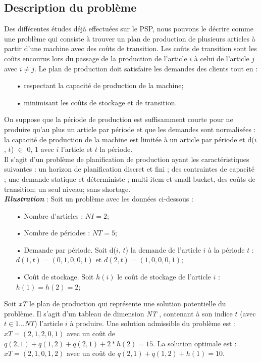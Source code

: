 	\subsection{Description du problème}{\label{sec:problem_description}}

		Des différentes études \cite{ratheil_master} \cite{ceschia} déjà effectuées sur le PSP, nous pouvons le décrire comme une problème qui consiste à trouver un plan de production de plusieurs articles à partir d’une machine avec des coûts de transition. Les coûts de transition sont les coûts encourus lors du passage de la production de l’article $i$ à celui de l’article $j$ avec $i \neq j$. Le plan de production doit satisfaire les demandes des clients tout en :
	\begin{itemize}
		\item[•] respectant la capacité de production de la machine;
		\item[•] minimisant les coûts de stockage et de transition.
	\end{itemize}
	\hspace*{.5cm} On suppose que la période de production est suffisamment courte pour ne produire qu’au plus un article par période et que les demandes sont normalisées : la capacité de production de la machine est limitée à un article par
période et d($i$, $t$) $ \in $ {0, 1} avec $i$ l’article et $t$ la période.\\
	\hspace*{.5cm} Il s’agit d’un problème de planification de production ayant les caractéristiques suivantes : un horizon de planification discret et fini ; des contraintes de capacité ; une demande statique et déterministe ; multi-item et small bucket, des coûts de transition; un seul niveau; sans shortage.\\

	\textbf{\textsl{Illustration}} : Soit un problème avec les données ci-dessous : \\
	\begin{itemize}
		\item[•] Nombre d’articles : $NI = 2$;
		\item[•] Nombre de périodes : $NT = 5$;
		\item[•] Demande par période. Soit d($i$, $t$) la demande de l’article $i$ à la période $t$ : $d(1, t) = (0, 1, 0, 0, 1)$ et $d(2, t) = (1, 0, 0, 0, 1)$;
		\item[•] Coût de stockage. Soit $h(i)$ le coût de stockage de l’article $i$ : $h(1) = h(2) = 2$;
	\end{itemize}
	Soit \emph{xT} le plan de production qui représente une solution potentielle du problème. Il s’agit d’un tableau de dimension \emph{NT} , contenant à son indice $t$ (avec $t  \in  {1...NT}$) l’article $i$ à produire. Une solution admissible du problème est : $ xT = (2, 1, 2, 0, 1)$ avec un coût de $ q(2, 1) + q(1, 2) + q(2, 1) + 2 * h(2) = 15 $. La solution optimale est : $ xT = (2, 1, 0, 1, 2)$ avec un coût de $q(2, 1) + q(1, 2) + h(1) = 10$.
		
